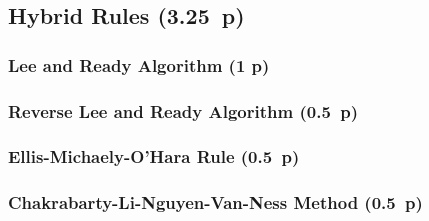\subsection{Hybrid Rules (3.25~p)}\label{hybrid-rules}

\subsubsection{Lee and Ready Algorithm (1 p)}\label{lee-and-ready-algorithm}

\subsubsection{Reverse Lee and Ready
  Algorithm (0.5~p)}\label{reverse-lee-and-ready-algorithm}

\subsubsection{Ellis-Michaely-O'Hara
  Rule (0.5~p)}\label{ellis-michaely-ohara-rule}

\begin{algorithm}


  \caption{$\operatorname{\mathtt{emo}}$ \label{alg:emo-rule}}


  \BlankLine %

\end{algorithm}

\subsubsection{Chakrabarty-Li-Nguyen-Van-Ness
  Method (0.5~p)}\label{chakarabarty-li-nguyen-van-ness-method}

